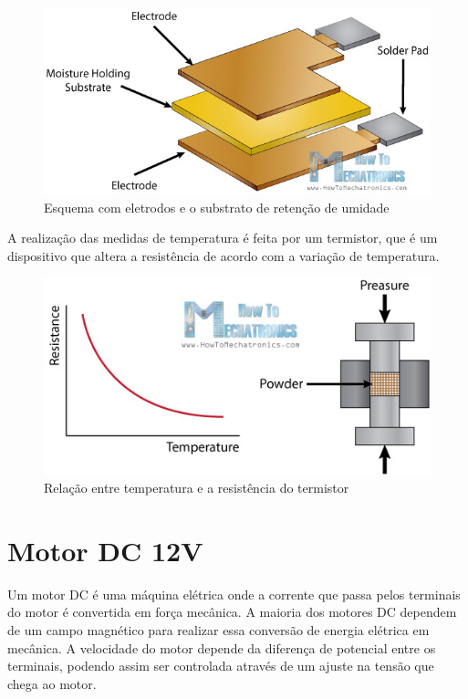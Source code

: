 \begin{figure}[H]
	\centering
	\includegraphics[width=12cm]{figuras/humity_sensor.jpg}
	\caption{Esquema com eletrodos e o substrato de retenção de umidade}
	\label{humity_sensor}
\end{figure}

A realização das medidas de temperatura é feita por um termistor, que é um dispositivo que altera a resistência de acordo com a variação de temperatura.

\begin{figure}[H]
	\centering
	\includegraphics[width=12cm]{figuras/thermistor.jpg}
	\caption{Relação entre temperatura e a resistência do termistor}
	\label{thermistor}
\end{figure}

\section{Motor DC 12V}

Um motor DC é uma máquina elétrica onde a corrente que passa pelos terminais do motor é convertida em força mecânica. A maioria dos motores DC dependem de um campo magnético para realizar essa conversão de energia elétrica em mecânica. A velocidade do motor depende da diferença de potencial entre os terminais, podendo assim ser controlada  através de um ajuste na tensão que chega ao motor.

